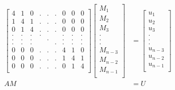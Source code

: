 \documentclass[12pt, letterpaper]{article}
\begin{document}
\begin{enumerate}
    \begin{equation*}
      \begin{split}
        \left[
          \begin{array}{lllllllll}
            4 & 1 & 0 & . & . & . & 0 & 0 & 0 \\
            1 & 4 & 1 & . & . & . & 0 & 0 & 0 \\
            0 & 1 & 4 & . & . & . & 0 & 0 & 0 \\
            . & . & . & . &   &   & . & . & . \\
            . & . & . &   & . &   & . & . & . \\
            . & . & . &   &   & . & . & . & . \\
            0 & 0 & 0 & . & . & . & 4 & 1 & 0 \\
            0 & 0 & 0 & . & . & . & 1 & 4 & 1 \\
            0 & 0 & 0 & . & . & . & 0 & 1 & 4 \\
          \end{array}
          \right]
        \left[
          \begin{array}{l}
            M_1 \\
            M_2 \\
            M_3 \\
            .   \\
            .   \\
            .   \\
            M_{n-3} \\
            M_{n-2} \\
            M_{n-1} \\
          \end{array}
          \right]
        & =
        \left[
          \begin{array}{l}
            u_1 \\
            u_2 \\
            u_3 \\
            .   \\
            .   \\
            .   \\
            u_{n-3} \\
            u_{n-2} \\
            u_{n-1} \\
          \end{array}
          \right] \\
        AM &= U
      \end{split}
    \end{equation*}


\end{enumerate}
\end{document}
